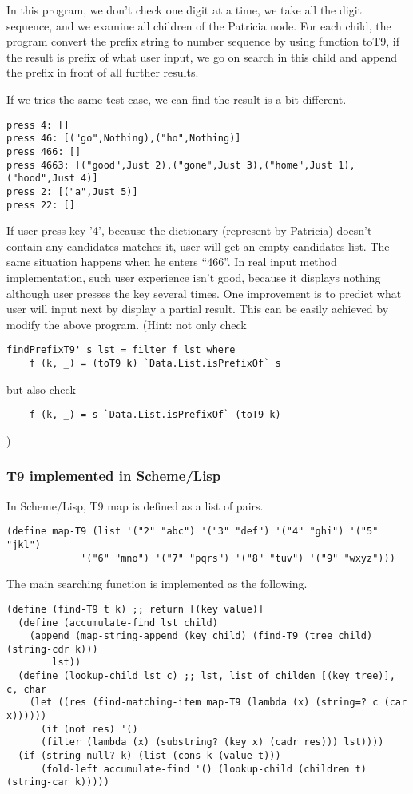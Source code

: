 \documentclass{article}
\begin{document}
In this program, we don't check one digit at a time, we take all the digit
sequence, and we examine all children of the Patricia node. For each child,
the program convert the prefix string to number sequence by using function 
toT9, if the result is prefix of what user input, we go on search in this 
child and append the prefix in front of all further results.

If we tries the same test case, we can find the result is a bit different.

\begin{verbatim}
press 4: []
press 46: [("go",Nothing),("ho",Nothing)]
press 466: []
press 4663: [("good",Just 2),("gone",Just 3),("home",Just 1),("hood",Just 4)]
press 2: [("a",Just 5)]
press 22: []
\end{verbatim}

If user press key '4', because the dictionary (represent by Patricia) doesn't
contain any candidates matches it, user will get an empty candidates list.
The same situation happens when he enters ``466''. In real input method 
implementation, such user experience isn't good, because it displays nothing
although user presses the key several times. One improvement is to 
predict what user will input next by display a partial result. This can be 
easily achieved by modify the above program. (Hint: not only check
\begin{lstlisting}
findPrefixT9' s lst = filter f lst where
    f (k, _) = (toT9 k) `Data.List.isPrefixOf` s
\end{lstlisting}
but also check
\begin{lstlisting}
    f (k, _) = s `Data.List.isPrefixOf` (toT9 k)
\end{lstlisting}
)

\subsubsection*{T9 implemented in Scheme/Lisp}

In Scheme/Lisp, T9 map is defined as a list of pairs.

\lstset{language=lisp}
\begin{lstlisting}
(define map-T9 (list '("2" "abc") '("3" "def") '("4" "ghi") '("5" "jkl")
		     '("6" "mno") '("7" "pqrs") '("8" "tuv") '("9" "wxyz")))
\end{lstlisting}

The main searching function is implemented as the following.

\begin{lstlisting}
(define (find-T9 t k) ;; return [(key value)]
  (define (accumulate-find lst child)
    (append (map-string-append (key child) (find-T9 (tree child) (string-cdr k))) 
	    lst))
  (define (lookup-child lst c) ;; lst, list of childen [(key tree)], c, char
    (let ((res (find-matching-item map-T9 (lambda (x) (string=? c (car x))))))
      (if (not res) '()
	  (filter (lambda (x) (substring? (key x) (cadr res))) lst))))
  (if (string-null? k) (list (cons k (value t)))
      (fold-left accumulate-find '() (lookup-child (children t) (string-car k)))))
\end{lstlisting}
\end{document}

